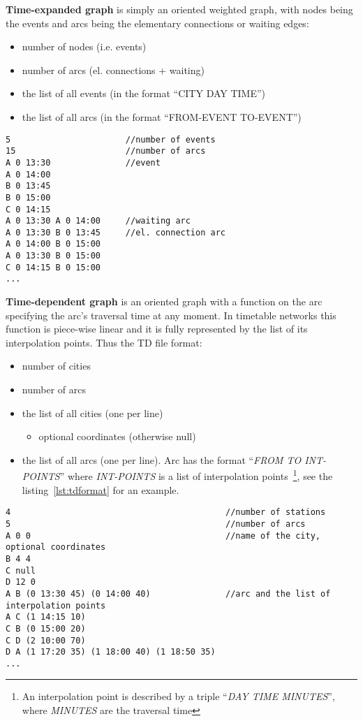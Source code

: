\noindent \textbf{Time-expanded graph} is simply an oriented weighted graph, with nodes being the events and arcs being the elementary connections or waiting edges:
\begin{itemize}
	\item number of nodes (i.e. events)
	\item number of arcs (el. connections + waiting)
	\item the list of all events (in the format ``CITY DAY TIME'')
	\item the list of all arcs (in the format ``FROM-EVENT TO-EVENT'')
\end{itemize}
\hspace*{\fill}

\begin{lstlisting}[caption={TE file format}]
5                       //number of events
15                      //number of arcs
A 0 13:30               //event
A 0 14:00
B 0 13:45
B 0 15:00
C 0 14:15
A 0 13:30 A 0 14:00     //waiting arc
A 0 13:30 B 0 13:45     //el. connection arc
A 0 14:00 B 0 15:00
A 0 13:30 B 0 15:00
C 0 14:15 B 0 15:00
...
\end{lstlisting}

\noindent \textbf{Time-dependent graph} is an oriented graph with a function on the arc specifying the arc's traversal time at any moment. In timetable networks this function is piece-wise linear and it is fully represented by the list of its interpolation points. Thus the TD file format:
\begin{itemize}
	\item number of cities
	\item number of arcs
	\item the list of all cities  (one per line)
	\begin{itemize}
		\item optional coordinates (otherwise null)
	\end{itemize}
	\item the list of all arcs (one per line). Arc has the format ``\textit{FROM TO INT-POINTS}'' where \textit{INT-POINTS} is a list of interpolation points~\footnote{An interpolation point is described by a triple ``\textit{DAY TIME MINUTES}'', where \textit{MINUTES} are the traversal time}, see the listing~\ref{lst:tdformat} for an example.
\end{itemize}
\hspace*{\fill}

\begin{lstlisting}[caption={TD file format}, label={lst:tdformat}]
4                                           //number of stations
5                                           //number of arcs
A 0 0                                       //name of the city, optional coordinates
B 4 4
C null
D 12 0
A B (0 13:30 45) (0 14:00 40)               //arc and the list of interpolation points
A C (1 14:15 10)
C B (0 15:00 20)
C D (2 10:00 70)
D A (1 17:20 35) (1 18:00 40) (1 18:50 35)
...
\end{lstlisting}